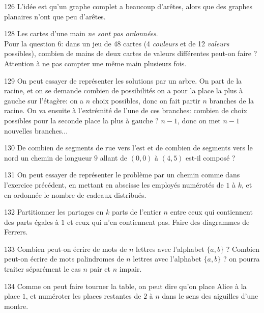 \begin{Hint}{126}
L'idée est qu'un graphe complet a \og beaucoup\fg{} d'arêtes, alors que des graphes planaires n'ont que \og peu\fg{} d'arêtes.
\end{Hint}
\begin{Hint}{128}
Les cartes d'une main \emph{ne sont pas ordonnées}.\\
Pour la question 6: dans un jeu de 48 cartes (4 \emph{couleurs} et de 12 \emph{valeurs} possibles), combien de mains de deux cartes de valeurs différentes peut-on faire ? Attention à ne pas compter une même main plusieurs fois.
\end{Hint}
\begin{Hint}{129}
On peut essayer de représenter les solutions par un arbre.  On part de la racine, et on se demande combien de possibilités on a pour la place la plus à gauche sur l'étagère: on a $n$ choix possibles, donc on fait partir $n$ branches de la racine. On va ensuite à l'extrémité de l'une de ces branches: combien de choix possibles pour la seconde place la plus à gauche ? $n-1$, donc on met $n-1$ nouvelles branches...
\end{Hint}
\begin{Hint}{130}
De combien de segments de rue \og vers l'est \fg{} et de combien de segments \og vers le nord \fg{} un chemin de longueur $9$ allant de $(0,0)$ à $(4,5)$ est-il composé ?
\end{Hint}
\begin{Hint}{131}
On peut essayer de représenter le problème par un chemin comme dans l'exercice précédent, en mettant en abscisse les employés numérotés de $1$ à $k$, et en ordonnée le nombre de cadeaux distribués.
\end{Hint}
\begin{Hint}{132}
Partitionner les partages en $k$ parts de l'entier $n$ entre ceux qui contiennent des parts égales à $1$ et ceux qui n'en contiennent pas.
Faire des diagrammes de Ferrers.
\end{Hint}
\begin{Hint}{133}
Combien peut-on écrire de mots de $n$ lettres avec l'alphabet $\{a,b\}$ ? Combien peut-on écrire de mots palindromes de $n$ lettres avec l'alphabet $\{a,b\}$ ? on pourra traiter séparément le cas $n$ pair et $n$ impair.
\end{Hint}
\begin{Hint}{134}
Comme on peut faire tourner la table, on peut dire qu'on place Alice à la place $1$, et numéroter les places restantes de $2$ à $n$ dans le sens des aiguilles d'une montre.
\end{Hint}

